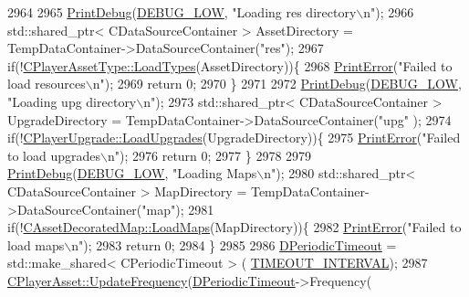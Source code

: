 \begin{DoxyCode}
2964     
2965     \hyperlink{Debug_8h_aa5f00f5537c9760f6ae1782460748ab9}{PrintDebug}(\hyperlink{Debug_8h_a3a5f3fc09784650d8388cb854882f840}{DEBUG\_LOW}, \textcolor{stringliteral}{"Loading res directory\(\backslash\)n"});
2966     std::shared\_ptr< CDataSourceContainer > AssetDirectory = TempDataContainer->DataSourceContainer(\textcolor{stringliteral}{"res"});
2967     \textcolor{keywordflow}{if}(!\hyperlink{classCPlayerAssetType_ad36348338ae4fea7e70450ef30c92a26}{CPlayerAssetType::LoadTypes}(AssetDirectory))\{
2968         \hyperlink{Debug_8h_a2ed825eefefe35baf59a93a8c641323d}{PrintError}(\textcolor{stringliteral}{"Failed to load resources\(\backslash\)n"});
2969         \textcolor{keywordflow}{return} 0;   
2970     \}
2971     
2972     \hyperlink{Debug_8h_aa5f00f5537c9760f6ae1782460748ab9}{PrintDebug}(\hyperlink{Debug_8h_a3a5f3fc09784650d8388cb854882f840}{DEBUG\_LOW}, \textcolor{stringliteral}{"Loading upg directory\(\backslash\)n"});
2973     std::shared\_ptr< CDataSourceContainer > UpgradeDirectory = TempDataContainer->DataSourceContainer(\textcolor{stringliteral}{"upg"}
      );
2974     \textcolor{keywordflow}{if}(!\hyperlink{classCPlayerUpgrade_a9bef3d3f2866cd555a9b175426e953d6}{CPlayerUpgrade::LoadUpgrades}(UpgradeDirectory))\{
2975         \hyperlink{Debug_8h_a2ed825eefefe35baf59a93a8c641323d}{PrintError}(\textcolor{stringliteral}{"Failed to load upgrades\(\backslash\)n"});
2976         \textcolor{keywordflow}{return} 0;   
2977     \}
2978 
2979     \hyperlink{Debug_8h_aa5f00f5537c9760f6ae1782460748ab9}{PrintDebug}(\hyperlink{Debug_8h_a3a5f3fc09784650d8388cb854882f840}{DEBUG\_LOW}, \textcolor{stringliteral}{"Loading Maps\(\backslash\)n"});
2980     std::shared\_ptr< CDataSourceContainer > MapDirectory = TempDataContainer->DataSourceContainer(\textcolor{stringliteral}{"map"});
2981     \textcolor{keywordflow}{if}(!\hyperlink{classCAssetDecoratedMap_a03b043bddf72e2d97171b704f538f4d0}{CAssetDecoratedMap::LoadMaps}(MapDirectory))\{
2982         \hyperlink{Debug_8h_a2ed825eefefe35baf59a93a8c641323d}{PrintError}(\textcolor{stringliteral}{"Failed to load maps\(\backslash\)n"});
2983         \textcolor{keywordflow}{return} 0;   
2984     \}
2985     
2986     \hyperlink{classCApplicationData_a0265cb7aba9f099faed2a1c8ee588d33}{DPeriodicTimeout} = std::make\_shared< CPeriodicTimeout > (
      \hyperlink{main_8cpp_a13f06f86104b4525a9429ff04d1c852d}{TIMEOUT\_INTERVAL});
2987     \hyperlink{classCPlayerAsset_a0aff85b9552967a42f4f3f42cb59c19f}{CPlayerAsset::UpdateFrequency}(\hyperlink{classCApplicationData_a0265cb7aba9f099faed2a1c8ee588d33}{DPeriodicTimeout}->Frequency(

\end{DoxyCode}
